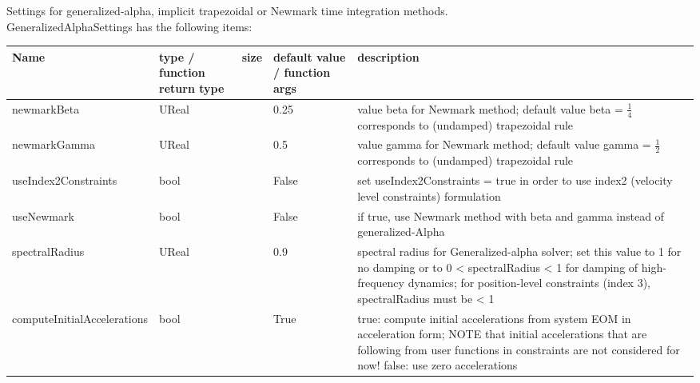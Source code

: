  \label{sec_GeneralizedAlphaSettings}
Settings for generalized-alpha, implicit trapezoidal or Newmark time integration methods.\\ 
%
GeneralizedAlphaSettings has the following items:
\begin{center}
  \footnotesize
  \begin{longtable}{| p{4.2cm} | p{2.5cm} | p{0.3cm} | p{3.0cm} | p{6cm} |}
    \hline
    \bf Name & \bf type / function return type & \bf size & \bf default value / function args & \bf description \\ \hline
    newmarkBeta &     UReal &      &     0.25 &     value beta for Newmark method; default value beta = $\frac 1 4$ corresponds to (undamped) trapezoidal rule\\ \hline
    newmarkGamma &     UReal &      &     0.5 &     value gamma for Newmark method; default value gamma = $\frac 1 2$ corresponds to (undamped) trapezoidal rule\\ \hline
    useIndex2Constraints &     bool &      &     False &     set useIndex2Constraints = true in order to use index2 (velocity level constraints) formulation\\ \hline
    useNewmark &     bool &      &     False &     if true, use Newmark method with beta and gamma instead of generalized-Alpha\\ \hline
    spectralRadius &     UReal &      &     0.9 &     spectral radius for Generalized-alpha solver; set this value to 1 for no damping or to 0 < spectralRadius < 1 for damping of high-frequency dynamics; for position-level constraints (index 3), spectralRadius must be < 1\\ \hline
    computeInitialAccelerations &     bool &      &     True &     true: compute initial accelerations from system EOM in acceleration form; NOTE that initial accelerations that are following from user functions in constraints are not considered for now! false: use zero accelerations\\ \hline
	  \end{longtable}
	\end{center}

